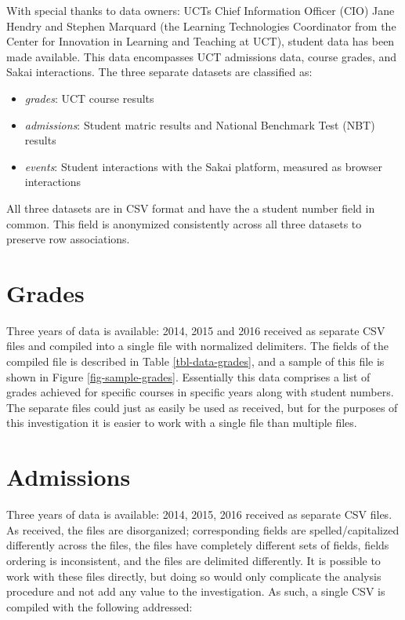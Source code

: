 With special thanks to data owners: UCTs Chief Information Officer (CIO) Jane Hendry and Stephen Marquard (the Learning Technologies Coordinator from the Center for Innovation in Learning and Teaching at UCT), student data has been made available. This data encompasses UCT admissions data, course grades, and Sakai interactions. The three separate datasets are classified as:

\begin{itemize}
    \item \textit{grades}: UCT course results
    \item \textit{admissions}: Student matric results and National Benchmark Test (NBT) results
    \item \textit{events}: Student interactions with the Sakai platform, measured as browser interactions
\end{itemize}

All three datasets are in CSV format and have the a student number field in common. This field is anonymized consistently across all three datasets to preserve row associations.

\section{Grades}
Three years of data is available: 2014, 2015 and 2016 received as separate CSV files and compiled into a single file with normalized delimiters. The fields of the compiled file is described in Table \ref{tbl-data-grades}, and a sample of this file is shown in Figure \ref{fig-sample-grades}. Essentially this data comprises a list of grades achieved for specific courses in specific years along with student numbers. The separate files could just as easily be used as received, but for the purposes of this investigation it is easier to work with a single file than multiple files.




\section{Admissions}
Three years of data is available: 2014, 2015, 2016 received as separate CSV files. As received, the files are disorganized; corresponding fields are spelled/capitalized differently across the files, the files have completely different sets of fields, fields ordering is inconsistent, and the files are delimited differently. It is possible to work with these files directly, but doing so would only complicate the analysis procedure and not add any value to the investigation. As such, a single CSV is compiled with the following addressed:

